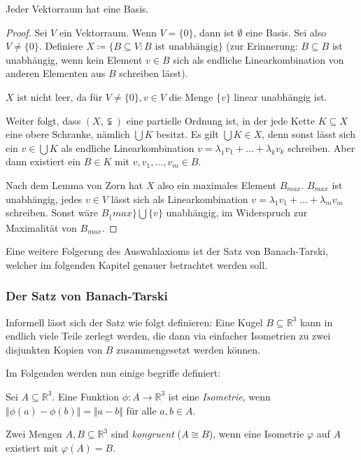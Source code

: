 \begin{satz}
	Jeder Vektorraum hat eine Basis.
\end{satz}
\begin{proof}
	Sei $V$ ein Vektorraum. Wenn $V=\{0\}$, dann ist $\emptyset$ eine Basis. Sei also $V\neq\{0\}$. Definiere $X\coloneqq\{B\subseteq V : B\text{ ist unabhängig}\}$ (zur Erinnerung: $B\subseteq B$ ist unabhängig, wenn kein Element $v\in B$ sich als endliche Linearkombination von anderen Elementen aus $B$ schreiben lässt).
	
	$X$ ist nicht leer, da für $V\neq\{0\}, v\in V$ die Menge $\{v\}$ linear unabhängig ist.
	
	Weiter folgt, dass $(X,\subsetneqq)$ eine partielle Ordnung ist, in der jede Kette $K\subseteq X$ eine obere Schranke, nämlich $\bigcup K$ besitzt. Es gilt $\bigcup K\in X$, denn sonst lässt sich ein $v\in\bigcup K$ als endliche Linearkombination $v=\lambda_1v_1+\dots+\lambda_kv_k$ schreiben. Aber dann existiert ein $B\in K$ mit $v,v_1,\dots,v_m\in B$.
	
	Nach dem Lemma von Zorn hat $X$ also ein maximales Element $B_{max}$. $B_{max}$ ist unabhängig, jedes $v\in V$ lässt sich als Linearkombination $v=\lambda_1v_1+\dots+\lambda_mv_m$ schreiben. Sonst wäre $B_\{max\}\bigcup \{v\}$ unabhängig, im Widerspruch zur Maximalität von $B_{max}$.
\end{proof}

Eine weitere Folgerung des Auswahlaxioms ist der Satz von Banach-Tarski, welcher im folgenden Kapitel genauer betrachtet werden soll.

\subsubsection{Der Satz von Banach-Tarski}

Informell lässt sich der Satz wie folgt definieren: \glqq Eine Kugel $B\subseteq\mathbb{R}^3$ kann in endlich viele Teile zerlegt werden, die dann via einfacher Isometrien zu zwei disjunkten Kopien von $B$ zusammengesetzt werden können.\grqq{}

Im Folgenden werden nun einige begriffe definiert:

\begin{definition}[Isometrie]
	Sei $A\subseteq\mathbb{R}^3$. Eine Funktion $\phi:A\to\mathbb{R}^3$ ist eine \textit{Isometrie}, wenn $\Vert\phi(a)-\phi(b)\Vert=\Vert a-b\Vert$ für alle $a,b\in A$.
\end{definition}

\begin{definition}[Kongruenz]
	Zwei Mengen $A,B\subseteq\mathbb{R}^3$ sind \textit{kongruent} ($A\cong B$), wenn eine Isometrie $\varphi$ auf $A$ existiert mit $\varphi(A)=B$.
\end{definition}


